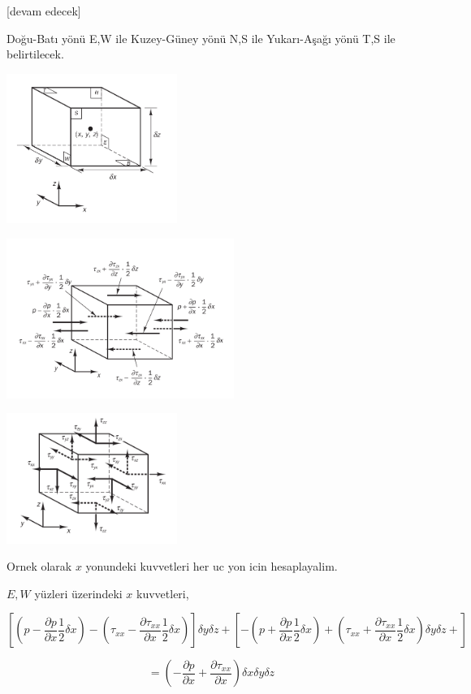 \documentclass[12pt,fleqn]{article}\usepackage{../../common}
\begin{document}
[devam edecek]


Doğu-Batı yönü E,W ile Kuzey-Güney yönü N,S ile Yukarı-Aşağı yönü T,S
ile belirtilecek. 

\includegraphics[width=15em]{phy_030_fluid2_03.png}

\includegraphics[width=20em]{phy_030_fluid2_01.png}

\includegraphics[width=15em]{phy_030_fluid2_02.png}


Ornek olarak $x$ yonundeki kuvvetleri her uc yon icin hesaplayalim.

$E,W$ yüzleri üzerindeki $x$ kuvvetleri, 

$$
\left[
  \left( p - \frac{\partial p}{\partial x} \frac{1}{2} \delta x \right) -
  \left( \tau_{xx} - \frac{\partial \tau_{xx}}{\partial x} \frac{1}{2} \delta x \right) 
\right]
  \delta y \delta z  +
\left[
  -\left( p + \frac{\partial p}{\partial x} \frac{1}{2} \delta x \right) +
  \left( \tau_{xx} + \frac{\partial \tau_{xx}}{\partial x} \frac{1}{2} \delta x \right) 
  \delta y \delta z  +  
\right]
$$

$$
= \left(
-\frac{\partial p}{\partial x} + \frac{\partial \tau_{xx}}{\partial x}
\right)
\delta x \delta y \delta z
$$
\end{document}
